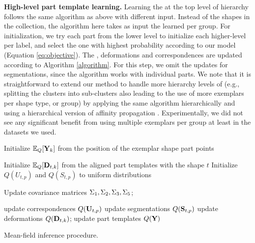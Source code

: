 \textbf{High-level part template learning.} Learning the  at the top level of hierarchy follows the same algorithm as above with different input. Instead of the shapes in the collection, the algorithm here takes as input the learned  per group. For initialization, we try each part from the lower level to initialize each higher-level  per label, and select the one with highest probability according to our model (Equation \ref{eq:objective}). The , deformations and correspondences are updated according to Algorithm \ref{algorithm}. For this step, we omit the updates for segmentations, since the algorithm works with individual parts. We note that it is straightforward to extend our method to handle more hierarchy levels of  (e.g., splitting the clusters into sub-clusters also leading to the use of more exemplars per shape type, or group) by applying the same algorithm hierarchically and using a hierarchical version of affinity propagation \cite{Givoni11}. Experimentally, we did not see any significant benefit from using multiple exemplars per group at least in the datasets we used.



\begin{algorithm}
\LinesNumbered
{}
\BlankLine

Initialize $\mathbb{E}_Q[\mathbf{Y}_k]$ from the position of the exemplar shape part points\;

 {
  {   
   Initialize $\mathbb{E}_Q[\mathbf{D}_{t,k}]$ from the aligned part templates with the shape $t$\;
  }
  {     
   Initialize $Q(U_{t,p})$ and $Q(S_{t,p})$ to uniform distributions\;
  }
 }
 
{
  Update covariance matrices $\mbox{\relax$\Sigma$}_1, \mbox{\relax$\Sigma$}_2, \mbox{\relax$\Sigma$}_3, \mbox{\relax$\Sigma$}_5$;
        
  {     
         {  
            { 
                  update correspondences $Q(\mathbf{U}_{t,p})$\;
                  update segmentations $Q(\mathbf{S}_{t,p})$\;
            }  
            { 
                { 
                     update deformations $Q(\mathbf{D}_{t,k})$;
                }
            }
         }
  }
  update part templates $Q(\mathbf{Y})$\;
}
\vskip 1mm
\caption{Mean-field inference procedure.}
\label{algorithm}
\end{algorithm}




